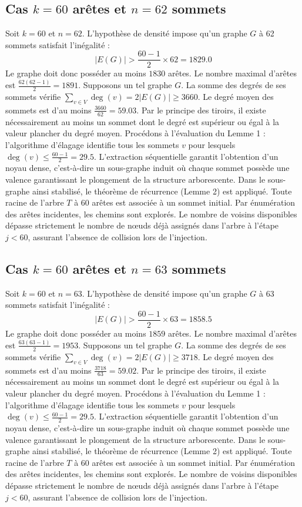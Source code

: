 \documentclass[12pt,a4paper]{article}
\begin{document}
\subsection{Cas $k = 60$ arêtes et $n = 62$ sommets}
Soit $k = 60$ et $n = 62$. L'hypothèse de densité impose qu'un graphe $G$ à 62 sommets satisfait l'inégalité :
$$ |E(G)| > \frac{60-1}{2} \times 62 = 1829.0 $$
Le graphe doit donc posséder au moins $1830$ arêtes. Le nombre maximal d'arêtes est $\frac{62(62-1)}{2} = 1891$.
Supposons un tel graphe $G$. La somme des degrés de ses sommets vérifie $\sum_{v \in V} \deg(v) = 2|E(G)| \geq 3660$.
Le degré moyen des sommets est d'au moins $\frac{3660}{62} = 59.03$.
Par le principe des tiroirs, il existe nécessairement au moins un sommet dont le degré est supérieur ou égal à la valeur plancher du degré moyen.
Procédons à l'évaluation du Lemme 1 : l'algorithme d'élagage identifie tous les sommets $v$ pour lesquels $\deg(v) \leq \frac{60-1}{2} = 29.5$.
L'extraction séquentielle garantit l'obtention d'un noyau dense, c'est-à-dire un sous-graphe induit où chaque sommet possède une valence garantissant le plongement de la structure arborescente.
Dans le sous-graphe ainsi stabilisé, le théorème de récurrence (Lemme 2) est appliqué. Toute racine de l'arbre $T$ à 60 arêtes est associée à un sommet initial. Par énumération des arêtes incidentes, les chemins sont explorés. Le nombre de voisins disponibles dépasse strictement le nombre de nœuds déjà assignés dans l'arbre à l'étape $j < 60$, assurant l'absence de collision lors de l'injection.

\subsection{Cas $k = 60$ arêtes et $n = 63$ sommets}
Soit $k = 60$ et $n = 63$. L'hypothèse de densité impose qu'un graphe $G$ à 63 sommets satisfait l'inégalité :
$$ |E(G)| > \frac{60-1}{2} \times 63 = 1858.5 $$
Le graphe doit donc posséder au moins $1859$ arêtes. Le nombre maximal d'arêtes est $\frac{63(63-1)}{2} = 1953$.
Supposons un tel graphe $G$. La somme des degrés de ses sommets vérifie $\sum_{v \in V} \deg(v) = 2|E(G)| \geq 3718$.
Le degré moyen des sommets est d'au moins $\frac{3718}{63} = 59.02$.
Par le principe des tiroirs, il existe nécessairement au moins un sommet dont le degré est supérieur ou égal à la valeur plancher du degré moyen.
Procédons à l'évaluation du Lemme 1 : l'algorithme d'élagage identifie tous les sommets $v$ pour lesquels $\deg(v) \leq \frac{60-1}{2} = 29.5$.
L'extraction séquentielle garantit l'obtention d'un noyau dense, c'est-à-dire un sous-graphe induit où chaque sommet possède une valence garantissant le plongement de la structure arborescente.
Dans le sous-graphe ainsi stabilisé, le théorème de récurrence (Lemme 2) est appliqué. Toute racine de l'arbre $T$ à 60 arêtes est associée à un sommet initial. Par énumération des arêtes incidentes, les chemins sont explorés. Le nombre de voisins disponibles dépasse strictement le nombre de nœuds déjà assignés dans l'arbre à l'étape $j < 60$, assurant l'absence de collision lors de l'injection.
\end{document}
